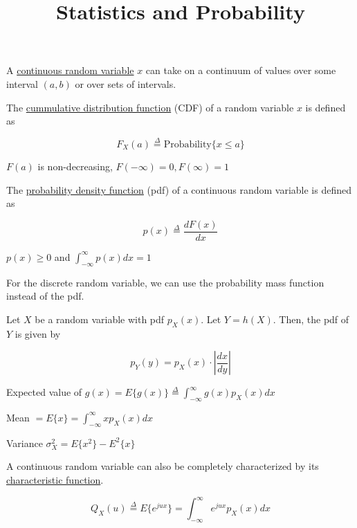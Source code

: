 \documentclass[fleqn]{article}
\title{Statistics and Probability}
\author{}
\date{}
\newcommand{\zerodisplayskip}{
	\setlength{\abovedisplayskip}{0pt}%
	\setlength{\belowdisplayskip}{0pt}%
	\setlength{\abovedisplayshortskip}{0pt}%
	\setlength{\belowdisplayshortskip}{0pt}%
	\setlength{\mathindent}{0pt}}
\begin{document}
	\offinterlineskip
	\setlength{\lineskip}{12pt}
	\zerodisplayskip
	\maketitle
	
	A \underline{continuous random variable} $x$ can take on a continuum of values over some interval $(a,b)$ or over sets of intervals.
	
	The \underline{cummulative distribution function} (CDF) of a random variable $x$ is defined as
	
	\begin{equation*}
		F_X(a) \overset{\Delta}{=} \text{Probability}\{x \leq a\}
	\end{equation*}
	
	$F(a)$ is non-decreasing, $F(-\infty) = 0, F(\infty) = 1$
	
	The \underline{probability density function} (pdf) of a continuous random variable is defined as
	
	\begin{equation*}
		p(x) \overset{\Delta}{=} \frac{dF(x)}{dx}
	\end{equation*}
	
	$p(x) \geq 0$ and $\int_{-\infty}^{\infty}p(x)dx = 1$
	
	For the discrete random variable, we can use the probability mass function instead of the pdf.
	
	Let $X$ be a random variable with pdf $p_X(x)$. Let $Y = h(X)$. Then, the pdf of $Y$ is given by
	
	\begin{equation*}
		p_Y(y) = p_X(x) \cdot \left|\frac{dx}{dy}\right|
	\end{equation*}
	
	Expected value of $g(x) = E\{g(x)\} \overset{\Delta}{=}\int_{-\infty}^{\infty}g(x)p_X(x)dx$
	
	Mean $ = E\{x\} = \int_{-\infty}^{\infty}{xp_X(x)dx}$
	
	Variance $\sigma_X^2 = E\{x^2\} - E^2\{x\}$
	
	A continuous random variable can also be completely characterized by its \newline \underline{characteristic function}.
	
	\begin{equation*}
		Q_X(u) \overset{\Delta}{=} E\{e^{jux}\} = \int_{-\infty}^{\infty}{e^{jux}p_X(x)dx}
	\end{equation*}
	
\end{document}
